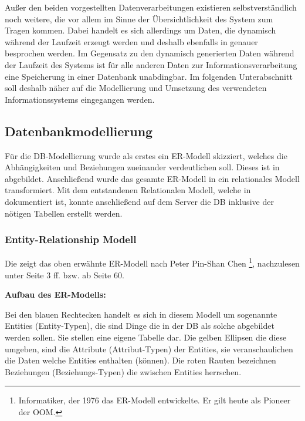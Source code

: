 \documentclass[12pt, twoside, a4paper, ngerman]{article}
\newcommand{\iz}[2]{#1 {\renewcommand{\baselinestretch}{1}\footnote{#2}}} %
\renewcommand{\baselinestretch}{1.5}
\begin{document}

Außer den beiden vorgestellten Datenverarbeitungen existieren selbstverständlich noch weitere, die vor allem im Sinne der Übersichtlichkeit des System  zum Tragen kommen. 
Dabei handelt es sich allerdings um Daten, die dynamisch während der Laufzeit erzeugt werden und deshalb ebenfalls in  genauer besprochen werden.
Im Gegensatz zu den dynamisch generierten Daten während der Laufzeit des Systems ist für alle anderen Daten zur Informationsverarbeitung eine Speicherung in einer Datenbank unabdingbar.
Im folgenden Unterabschnitt soll deshalb näher auf die Modellierung und Umsetzung des verwendeten Informationssystems eingegangen werden.

\subsection{Datenbankmodellierung}\label{subsec:Datenbankmodellierung}

Für die \ac{DB}-Modellierung wurde als erstes ein \ac{ER-Modell} skizziert, welches die Abhängigkeiten und Beziehungen zueinander verdeutlichen soll. Dieses ist in  abgebildet. Anschließend wurde das gesamte \ac{ER-Modell} in ein relationales Modell transformiert.
Mit dem entstandenen Relationalen Modell, welche in  dokumentiert ist, konnte anschließend auf dem Server die \ac{DB} inklusive der nötigen Tabellen erstellt werden.

\subsubsection{Entity-Relationship Modell}\label{subsec:ERModell}

Die  zeigt das oben erwähnte \ac{ER-Modell} nach \iz{Peter Pin-Shan Chen}{Informatiker, der 1976 das ER-Modell entwickelte. Er gilt heute als Pioneer der \ac{OOM}.}, nachzulesen unter \cite{ChenPe} Seite 3 ff. bzw. \cite{VossenG-DDD} ab Seite 60.

\textbf{Aufbau des \ac{ER-Modell}s:}

Bei den blauen Rechtecken handelt es sich in diesem Modell um sogenannte Entities (Entity-Typen), die sind Dinge die in der \ac{DB} als solche abgebildet werden sollen. Sie stellen eine eigene Tabelle dar. Die gelben Ellipsen die diese umgeben, sind die Attribute (Attribut-Typen) der Entities, sie veranschaulichen die Daten welche Entities enthalten (können).
Die roten Rauten bezeichnen Beziehungen (Beziehungs-Typen) die zwischen Entities herrschen.
\end{document}
